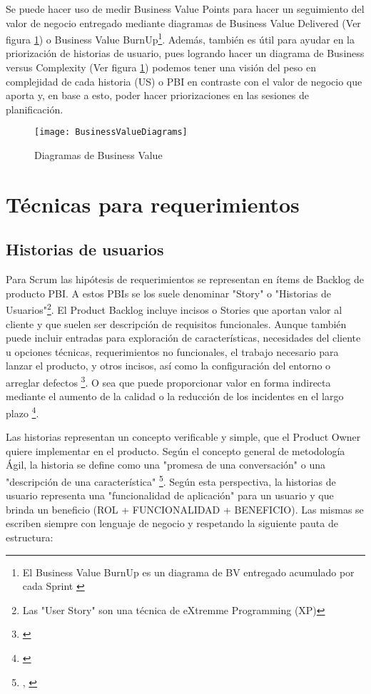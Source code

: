Se puede hacer uso de medir Business Value Points para hacer un seguimiento del valor de negocio entregado mediante diagramas de Business Value Delivered (Ver figura \ref{fig:BusinessValueDiagrams}) o Business Value BurnUp\footnote{El Business Value BurnUp es un diagrama de BV entregado acumulado por cada Sprint \cite{Scrum-Alliance-2005}}. Además, también es útil para ayudar en la priorización de historias de usuario, pues logrando hacer un diagrama de Business versus Complexity (Ver figura \ref{fig:BusinessValueDiagrams}) podemos tener una visión del peso en complejidad de cada historia (US) o PBI en contraste con el valor de negocio que aporta y, en base a esto, poder hacer priorizaciones en las sesiones de planificación.

\begin{figure}[h]
  \centering
  \texttt{[image: BusinessValueDiagrams]}
  \caption{Diagramas de Business Value}
  \centering
  \label{fig:BusinessValueDiagrams} %
\end{figure}

\newpage
\section{Técnicas para requerimientos}

\subsection{Historias de usuarios}

Para Scrum las hipótesis de requerimientos se representan en ítems de Backlog de producto PBI. A estos PBIs se los suele denominar "Story" o "Historias de Usuarios"\footnote{Las "User Story" son una técnica de eXtremme Programming (XP)}. El Product Backlog incluye incisos o Stories que aportan valor al cliente y que suelen ser descripción de requisitos funcionales. Aunque también puede incluir entradas para exploración de características, necesidades del cliente u opciones técnicas, requerimientos no funcionales, el trabajo necesario para lanzar el producto, y otros incisos, así como la configuración del entorno o arreglar defectos \footnote{\cite{Scrum-Institute-2015}}. O sea que puede proporcionar valor en forma indirecta mediante el aumento de la calidad o la reducción de los incidentes en el largo plazo \footnote{\cite{Scrum-Institute-2015}}.

Las historias representan un concepto verificable y simple, que el Product Owner quiere implementar en el producto. Según el concepto general de metodología Ágil, la historia se define como una "promesa de una conversación" o una "descripción de una característica" \footnote{\cite{UNTREF-2014}, \cite{Dan-North-2015}}. Según esta perspectiva, la historias de usuario representa una "funcionalidad de aplicación" para un usuario y que brinda un beneficio (ROL + FUNCIONALIDAD + BENEFICIO). Las mismas se escriben siempre con lenguaje de negocio y respetando la siguiente pauta de estructura:\newline

